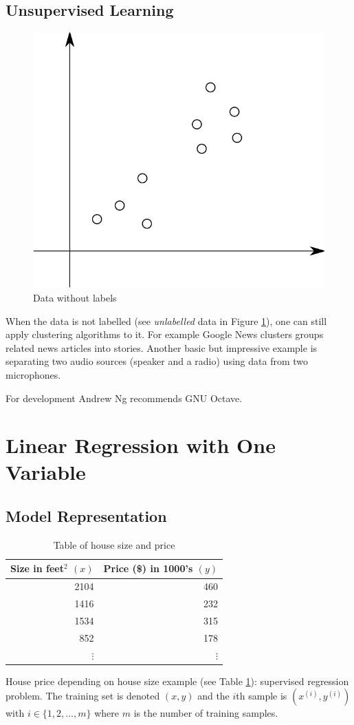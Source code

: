 \documentclass[a4paper,twoside,10pt]{article}
\begin{document}
\subsection{Unsupervised Learning}
\begin{figure}[htbp]
  \begin{center}
    \includegraphics[width=.4\textwidth]{unsupervised}
    \caption{Data without labels\label{fig:unsupervised}}
  \end{center}
\end{figure}
When the data is not labelled (see \emph{unlabelled} data in Figure \ref{fig:unsupervised}), one can still apply clustering algorithms to it.
For example Google News clusters groups related news articles into stories.
Another basic but impressive example is separating two audio sources (speaker and a radio) using data from two microphones.

For development Andrew Ng recommends GNU Octave\citep{octave}.

\section{Linear Regression with One Variable}
\subsection{Model Representation}
\begin{table}[htbp]
  \begin{center}
    \begin{tabular}{r|r}\toprule
      \multicolumn{1}{c|}{\textbf{Size in feet$^2$ $(x)$}} &
      \multicolumn{1}{c}{\textbf{Price (\$) in 1000's $(y)$}}\\\midrule
      2104 & 460\\
      1416 & 232\\
      1534 & 315\\
       852 & 178\\
      $\vdots$ & $\vdots$\\\bottomrule
    \end{tabular}
    \caption{Table of house size and price\label{tbl:houses}}
  \end{center}
\end{table}
\newcommand{\sxi}{\ensuremath{x^{(i)}}}
\newcommand{\syi}{\ensuremath{y^{(i)}}}
\newcommand{\sumi}{\ensuremath{\displaystyle\sum_{i=1}^m}}
House price depending on house size example (see Table \ref{tbl:houses}): supervised regression problem.
The training set is denoted $(x,y)$ and the $i$th sample is $(\sxi,\syi)$ with $i\in\{1,2,\ldots,m\}$ where $m$ is the number of training samples.
\end{document}
